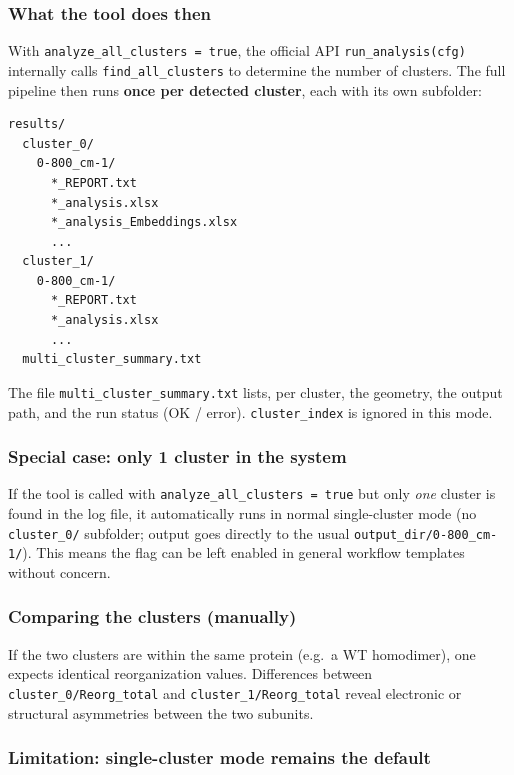 \documentclass[11pt,a4paper,twoside]{article}
\theoremstyle{remark}
\begin{document}
\subsubsection*{What the tool does then}

With \texttt{analyze\_all\_clusters = true}, the official API
\texttt{run\_analysis(cfg)} internally calls
\texttt{find\_all\_clusters} to determine the number of clusters.
The full pipeline then runs \textbf{once per detected cluster},
each with its own subfolder:

\begin{lstlisting}[style=bash]
results/
  cluster_0/
    0-800_cm-1/
      *_REPORT.txt
      *_analysis.xlsx
      *_analysis_Embeddings.xlsx
      ...
  cluster_1/
    0-800_cm-1/
      *_REPORT.txt
      *_analysis.xlsx
      ...
  multi_cluster_summary.txt
\end{lstlisting}

The file \texttt{multi\_cluster\_summary.txt} lists, per cluster,
the geometry, the output path, and the run status (OK / error).
\texttt{cluster\_index} is ignored in this mode.

\subsubsection*{Special case: only 1 cluster in the system}

If the tool is called with \texttt{analyze\_all\_clusters = true}
but only \emph{one} cluster is found in the log file, it
automatically runs in normal single-cluster mode (no
\texttt{cluster\_0/} subfolder; output goes directly to the usual
\texttt{output\_dir/0-800\_cm-1/}). This means the flag can be
left enabled in general workflow templates without concern.

\subsubsection*{Comparing the clusters (manually)}

If the two clusters are within the same protein (e.g.\ a WT
homodimer), one expects identical reorganization values.
Differences between \texttt{cluster\_0/Reorg\_total} and
\texttt{cluster\_1/Reorg\_total} reveal electronic or structural
asymmetries between the two subunits.

\subsubsection*{Limitation: single-cluster mode remains the default}
\end{document}
